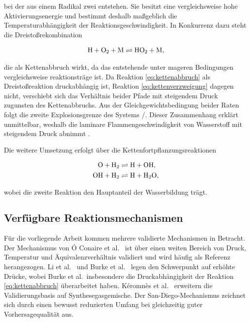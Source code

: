 bei der aus einem Radikal zwei entstehen. Sie besitzt eine vergleichsweise hohe
Aktivierungsenergie und bestimmt deshalb maßgeblich die Temperaturabhängigkeit
der Reaktionsgeschwindigkeit. In Konkurrenz dazu steht die
Dreistoßrekombination

\begin{equation}
	\label{eq:kettenabbruch}
	\ce{H} + \ce{O2} + \ce{M} \rightleftharpoons \ce{HO2} + \ce{M},
\end{equation}

die als Kettenabbruch wirkt, da das entstehende  unter mageren
Bedingungen vergleichsweise reaktionsträge ist. Da Reaktion
\eqref{eq:kettenabbruch} als Dreistoßreaktion druckabhängig ist, Reaktion
\eqref{eq:kettenverzweigung} dagegen nicht, verschiebt sich das Verhältnis
beider Pfade mit steigendem Druck zugunsten des Kettenabbruchs. Aus der
Gleichgewichtsbedingung beider Raten folgt die zweite Explosionsgrenze des
Systems /. Dieser Zusammenhang erklärt unmittelbar, weshalb die
laminare Flammengeschwindigkeit von Wasserstoff mit steigendem Druck abnimmt
\cite{Law_2006, Burke_2012}.

Die weitere Umsetzung erfolgt über die Kettenfortpflanzungsreaktionen

\begin{align}
	\label{eq:kettenfortpflanzung}
	\ce{O} + \ce{H2}  &\rightleftharpoons \ce{H} + \ce{OH}, \\
	\ce{OH} + \ce{H2} &\rightleftharpoons \ce{H} + \ce{H2O},
\end{align}

wobei die zweite Reaktion den Hauptanteil der Wasserbildung trägt.

\subsection{Verfügbare Reaktionsmechanismen}\label{subsec:mechanismen}

Für die vorliegende Arbeit kommen mehrere validierte Mechanismen in Betracht.
Der Mechanismus von Ó Conaire et al.\ \cite{OConaire_2004} ist über einen
weiten Bereich von Druck, Temperatur und Äquivalenzverhältnis validiert und
wird häufig als Referenz herangezogen. Li et al.\ \cite{Li_2004} und
Burke et al.\ \cite{Burke_2012} legen den Schwerpunkt auf erhöhte Drücke,
wobei Burke et al.\ insbesondere die Druckabhängigkeit der Reaktion
\eqref{eq:kettenabbruch} überarbeitet haben. Kéromnès et al.\
\cite{Keromnes_2013} erweitern die Validierungsbasis auf Synthesegasgemische.
Der San-Diego-Mechanismus \cite{SanDiego_Mech} zeichnet sich durch einen
bewusst reduzierten Umfang bei gleichzeitig guter Vorhersagequalität aus.

